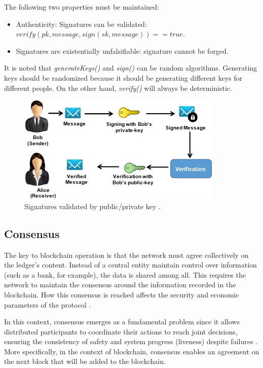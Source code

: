 The following two properties must be maintained:

\begin{itemize}
\item Authenticity: Signatures can be validated: \\ $verify(pk, message, sign(sk, message)) = = true$.
\item Signatures are existentially unfalsifiable: signature cannot be forged.
\end{itemize}

It is noted that \textit{generateKeys()} and \textit{sign()} can be random algorithms. Generating keys should be randomized because it should be generating different keys for different people. On the other hand, \textit{verify()} will always be deterministic.

\begin{figure}[htbp]
\begin{center}
  \includegraphics[scale=1.0]{images/AliceBob.jpg}
\caption{Signatures validated by public/private key \cite{forging}.}
\label{fig:authenticationExample}
\end{center}
\end{figure}

\subsection{Consensus}\label{sec:consenso}
The key to blockchain operation is that the network must agree collectively on the ledger's content.  Instead of a central entity maintain control over information (such as a bank, for example), the data is shared among all. This requires the network to maintain the consensus around the information recorded in the blockchain. How this consensus is reached affects the security and economic parameters of the protocol \cite{kostarev2017review}.

In this context, consensus emerges as a fundamental problem since it allows distributed participants to coordinate their actions to reach joint decisions, ensuring the consistency of safety and system progress (liveness) despite failures \cite{greve2018blockchain}. More specifically, in the context of blockchain, consensus enables an agreement on the next block that will be added to the blockchain.

